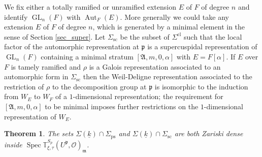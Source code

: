 \documentclass[JEP,XML,SOM,Unicode,NoEqCountersInSection]{cedram}
\let\mathcal\mathscr
\newcommand{\rps}{\mathrm{ps}}
\newcommand{\rsc}{\mathrm{sc}}
\newtheorem{thm}[prop]{Theorem}
\theoremstyle{definition}
\DeclareMathOperator{\Aut}{Aut}
\DeclareMathOperator{\GL}{GL}
\DeclareMathOperator{\Spec}{Spec}
\newcommand{\Aa}{\mathfrak A}
\newcommand{\mm}{\mathfrak m}
\newcommand{\cO}{\mathcal{O}}
\newcommand{\TT}{\mathbb T}
\newcommand{\pp}{\mathfrak p}
\begin{document}
We fix either a totally ramified or unramified extension $E$ of $F$ of degree $n$ and identify $\GL_n(F)$ with $\Aut_F(E)$. More generally we could take
any extension $E$ of $F$ of degree $n$, which is generated by a minimal element in the sense of Section \ref{sec_super}. Let $\Sigma_{\rsc}$ be the subset
of $\Sigma^{\mathrm{cl}}$ such that the local factor of the automorphic representation at $\pp$ is a supercuspidal representation of $\GL_n(F)$ containing a
minimal stratum $[\Aa, m, 0, \alpha]$ with $E= F[\alpha]$. If $E$ over $F$ is tamely ramified and $\rho$ is a Galois representation associated to an automorphic form
in $\Sigma_{\rsc}$ then the Weil-Deligne representation associated to
the restriction of $\rho$ to the decomposition group at $\pp$ is isomorphic to the induction from $W_E$ to $W_F$ of a $1$-dimensional representation; the
requirement for $[\Aa, m, 0, \alpha]$ to be minimal
imposes further restrictions on the $1$-dimensional representation of $W_E$.

\begin{thm}\label{dense_hecke} The sets $\Sigma(\underline{k})\cap \Sigma_{\rps}$ and $\Sigma(\underline{k})\cap \Sigma_{\rsc}$ are both Zariski dense inside $\Spec \TT^{S_p}_{\xi, \tau}(U^{\pp}, \cO)_{\mm}$.
\end{thm}
\end{document}
